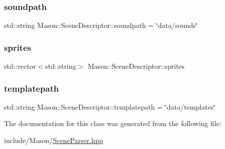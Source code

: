\hypertarget{class_mason_1_1_scene_descriptor_acd7e349dc63b0692c2f4912765db2cbe}{}\label{class_mason_1_1_scene_descriptor_acd7e349dc63b0692c2f4912765db2cbe} 
\subsubsection{\texorpdfstring{soundpath}{soundpath}}
{\footnotesize\ttfamily std\+::string Mason\+::\+Scene\+Descriptor\+::soundpath = \char`\"{}data/sounds\char`\"{}}

\hypertarget{class_mason_1_1_scene_descriptor_a0037cbfd772bbacb81017de405276475}{}\label{class_mason_1_1_scene_descriptor_a0037cbfd772bbacb81017de405276475} 
\subsubsection{\texorpdfstring{sprites}{sprites}}
{\footnotesize\ttfamily std\+::vector$<$std\+::string$>$ Mason\+::\+Scene\+Descriptor\+::sprites}

\hypertarget{class_mason_1_1_scene_descriptor_a5790bbda9414295660aa96be5824dbbb}{}\label{class_mason_1_1_scene_descriptor_a5790bbda9414295660aa96be5824dbbb} 
\subsubsection{\texorpdfstring{templatepath}{templatepath}}
{\footnotesize\ttfamily std\+::string Mason\+::\+Scene\+Descriptor\+::templatepath = \char`\"{}data/templates\char`\"{}}



The documentation for this class was generated from the following file\+:\begin{DoxyCompactItemize}
\item 
include/\+Mason/\hyperlink{_scene_parser_8hpp}{Scene\+Parser.\+hpp}\end{DoxyCompactItemize}
